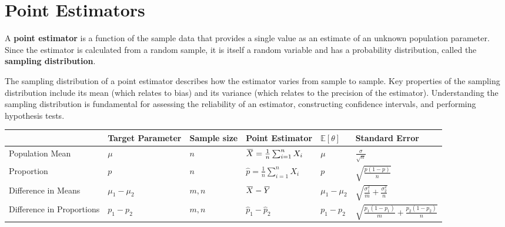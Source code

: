 \section{Point Estimators}
A \textbf{point estimator} is a function of the sample data that provides a single value as an estimate of an unknown population parameter. Since the estimator is calculated from a random sample, it is itself a random variable and has a probability distribution, called the \textbf{sampling distribution}.

The sampling distribution of a point estimator describes how the estimator varies from sample to sample. Key properties of the sampling distribution include its mean (which relates to bias) and its variance (which relates to the precision of the estimator). Understanding the sampling distribution is fundamental for assessing the reliability of an estimator, constructing confidence intervals, and performing hypothesis tests.

\begin{table}[h!]
\renewcommand{\arraystretch}{1.2}
\begin{tabularx}{\textwidth}{p{2.5cm}|l|l|X|l|X}
    & Target Parameter & Sample size & Point Estimator & $\mathbb{E}[\theta]$ & Standard Error \\
    \hline
    Population Mean & $\mu$ & $n$ & $\ols{X} = \frac{1}{n}\sum_{i=1}^n X_i$ & $\mu$ & $\frac{\sigma}{\sqrt{n}}$ \\
    Proportion & $p$ & $n$ & $\hat{p} = \frac{1}{n}\sum_{i=1}^n X_i$ & $p$ & $\sqrt{\frac{p(1-p)}{n}}$ \\
    Difference in Means & $\mu_1 - \mu_2$ & $m, n$ & $\ols{X} - \ols{Y}$ & $\mu_1 - \mu_2$ & $\sqrt{\frac{\sigma_1^2}{m} + \frac{\sigma_2^2}{n}}$ \\
    Difference in Proportions & $p_1 - p_2$ & $m, n$ & $\hat{p}_1 - \hat{p}_2$ & $p_1 - p_2$ & $\sqrt{\frac{p_1(1-p_1)}{m} + \frac{p_2(1-p_2)}{n}}$ \\
    \hline
\end{tabularx}
\end{table}

